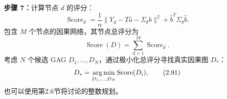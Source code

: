 \noindent\textbf{步骤 7：}计算节点 $d$ 的评分：
\begin{equation}
\operatorname{Score}_d=
\frac1n\lVert Y_d-T\widehat a-\Sigma_\theta\widehat b\rVert^2
+\widehat b^T\Sigma_\theta\widehat b.
\tag{2.89}
\end{equation}
包含 $M$ 个节点的因果网络，其节点总评分为
\begin{equation}
\operatorname{Score}(D)=\sum_{d=1}^{M}\operatorname{Score}_d.
\tag{2.90}
\end{equation}
考虑 $N$ 个候选 GAG $D_1,\ldots,D_N$，通过极小化总评分寻找真实因果图 $D_*$：
\begin{equation}
D_*=\operatorname*{arg\,min}_{D_1,\ldots,D_N}\operatorname{Score}(D_i),
\tag{2.91}
\end{equation}
也可以使用第2.6节将讨论的整数规划。
